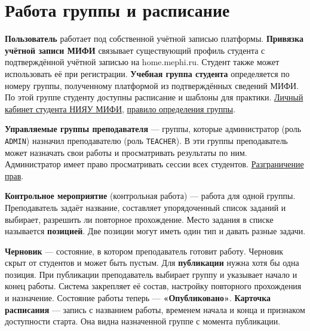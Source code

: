 \documentclass[12pt,a4paper]{article}
\begin{document}
\section{Работа группы и расписание}\label{ux440ux430ux431ux43eux442ux430-ux433ux440ux443ux43fux43fux44b-ux438-ux440ux430ux441ux43fux438ux441ux430ux43dux438ux435}

\hypertarget{работа-группы-и-расписание}{}

\textbf{Пользователь} работает под собственной учётной записью платформы. \textbf{Привязка учётной записи МИФИ} связывает существующий профиль студента с подтверждённой учётной записью на home.mephi.ru. Студент также может использовать её при регистрации. \textbf{Учебная группа студента} определяется по номеру группы, полученному платформой из подтверждённых сведений МИФИ. По этой группе студенту доступны расписание и шаблоны для практики. \href{https://mephi.ru/students/cab}{Личный кабинет студента НИЯУ МИФИ}, {\href{../../02\_Техническое\_задание/Техническое\_задание.pdf\#ts-req-func-group-join}{правило определения группы}}.

\textbf{Управляемые группы преподавателя} --- группы, которые администратор (роль \texttt{ADMIN}) назначил преподавателю (роль \texttt{TEACHER}). В эти группы преподаватель может назначать свои работы и просматривать результаты по ним. Администратор имеет право просматривать сессии всех студентов. {\href{../../02\_Техническое\_задание/Техническое\_задание.pdf\#ts-req-sec-roles}{Разграничение прав}}.

\textbf{Контрольное мероприятие} (контрольная работа) --- работа для одной группы. Преподаватель задаёт название, составляет упорядоченный список заданий и выбирает, разрешить ли повторное прохождение. Место задания в списке называется \textbf{позицией}. Две позиции могут иметь один тип и давать разные задачи.

\textbf{Черновик} --- состояние, в котором преподаватель готовит работу. Черновик скрыт от студентов и может быть пустым. Для \textbf{публикации} нужна хотя бы одна позиция. При публикации преподаватель выбирает группу и указывает начало и конец работы. Система закрепляет её состав, настройку повторного прохождения и назначение. Состояние работы теперь --- \textbf{«Опубликовано»}. \textbf{Карточка расписания} --- запись с названием работы, временем начала и конца и признаком доступности старта. Она видна назначенной группе с момента публикации.
\end{document}
